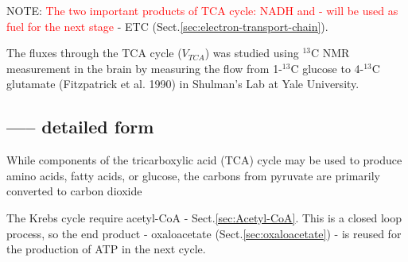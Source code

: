NOTE: \textcolor{red}{The two important products of TCA cycle: NADH and  -
will be used as fuel for the next stage} - ETC
(Sect.\ref{sec:electron-transport-chain}).

The fluxes through the TCA cycle ($V_{TCA}$) was studied using $^{13}$C NMR
measurement in the brain by measuring the flow from 1-$^{13}$C glucose to
4-$^{13}$C glutamate (Fitzpatrick et al. 1990) in Shulman's Lab at Yale
University.





\subsection{----- detailed form}
\label{sec:krebs-cycle-detailed-forms}

While components of the tricarboxylic acid (TCA) cycle may be used to produce
amino acids, fatty acids, or glucose, the carbons from pyruvate are primarily
converted to carbon dioxide

The Krebs cycle require acetyl-CoA - Sect.\ref{sec:Acetyl-CoA}. This is a closed
loop process, so the end product - oxaloacetate (Sect.\ref{sec:oxaloacetate}) -
is reused for the production of ATP in the next cycle.

